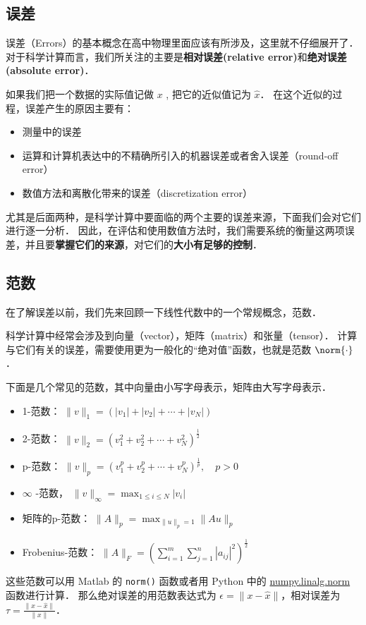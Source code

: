 
\subsection{误差}
误差（Errors）的基本概念在高中物理里面应该有所涉及，这里就不仔细展开了． 对于科学计算而言，我们所关注的主要是\textbf{相对误差(relative error)}和\textbf{绝对误差(absolute error)}．

如果我们把一个数据的实际值记做 $x$ , 把它的近似值记为 $\hat x$． 在这个近似的过程，误差产生的原因主要有：
\begin{itemize}
\item 测量中的误差
\item 运算和计算机表达中的不精确所引入的机器误差或者舍入误差（round-off error）
\item 数值方法和离散化带来的误差（discretization error）
\end{itemize}
尤其是后面两种，是科学计算中要面临的两个主要的误差来源，下面我们会对它们进行逐一分析． 因此，在评估和使用数值方法时，我们需要系统的衡量这两项误差，并且要\textbf{掌握它们的来源}，对它们的\textbf{大小有足够的控制}．

\subsection{范数}
在了解误差以前，我们先来回顾一下线性代数中的一个常规概念，范数．

科学计算中经常会涉及到向量（vector），矩阵（matrix）和张量（tensor）． 计算与它们有关的误差，需要使用更为一般化的“绝对值”函数，也就是范数 $\norm{\cdot}$．

下面是几个常见的范数，其中向量由小写字母表示，矩阵由大写字母表示．
\begin{itemize}
\item 1-范数：  $\|v\|_1=(|v_1|+|v_2|+\cdots+|v_N|)$
\item 2-范数：  $\|v\|_2=(v_1^2+v_2^2+\cdots+v_N^2)^{\frac{1}{2}}$
\item p-范数：  $\|v\|_p=(v_1^p+v_2^p+\cdots+v_N^p)^{\frac{1}{p}},\quad p>0$
\item $\infty$  -范数，  $\|v\|_{\infty}=\max_{1\le i \le N}|v_i|$
\item 矩阵的p-范数：  $\|A\|_p=\max_{\|u\|_p=1}\|Au\|_p$
\item Frobenius-范数：  $\|A\|_F=(\sum_{i=1}^m\sum_{j=1}^n|a_{ij}|^2)^{\frac{1}{2}}$
\end{itemize}

这些范数可以用 Matlab 的 \verb|norm()| 函数或者用 Python 中的 \href{https://docs.scipy.org/doc/numpy/reference/generated/numpy.linalg.norm.html}{numpy.linalg.norm} 函数进行计算． 那么绝对误差的用范数表达式为 $\epsilon=\|x-\hat{x}\|$，相对误差为  $\tau=\frac{\|x-\hat{x}\|}{\|x\|}$．

